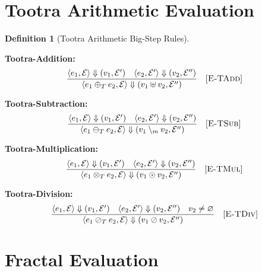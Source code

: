 \documentclass[11pt,twoside,openright]{book}
\theoremstyle{definition}
\newtheorem{definition}{Definition}[chapter]
\theoremstyle{plain}
\theoremstyle{remark}
\newcommand{\Tadd}{\oplus_T}
\newcommand{\Tsub}{\ominus_T}
\newcommand{\Tmul}{\otimes_T}
\newcommand{\Tdiv}{\oslash_T}
\newcommand{\bigstep}{\Downarrow}
\begin{document}
\section{Tootra Arithmetic Evaluation}

\begin{definition}[Tootra Arithmetic Big-Step Rules]
\label{def:tootra-bigstep}

\textbf{Tootra-Addition:}
\[
\frac{\langle e_1, \mathcal{E} \rangle \bigstep (v_1, \mathcal{E}') \quad \langle e_2, \mathcal{E}' \rangle \bigstep (v_2, \mathcal{E}'')}
{\langle e_1 \Tadd e_2, \mathcal{E} \rangle \bigstep (v_1 \uplus v_2, \mathcal{E}'')} \quad [\textsc{E-TAdd}]
\]

\textbf{Tootra-Subtraction:}
\[
\frac{\langle e_1, \mathcal{E} \rangle \bigstep (v_1, \mathcal{E}') \quad \langle e_2, \mathcal{E}' \rangle \bigstep (v_2, \mathcal{E}'')}
{\langle e_1 \Tsub e_2, \mathcal{E} \rangle \bigstep (v_1 \setminus_m v_2, \mathcal{E}'')} \quad [\textsc{E-TSub}]
\]

\textbf{Tootra-Multiplication:}
\[
\frac{\langle e_1, \mathcal{E} \rangle \bigstep (v_1, \mathcal{E}') \quad \langle e_2, \mathcal{E}' \rangle \bigstep (v_2, \mathcal{E}'')}
{\langle e_1 \Tmul e_2, \mathcal{E} \rangle \bigstep (v_1 \odot v_2, \mathcal{E}'')} \quad [\textsc{E-TMul}]
\]

\textbf{Tootra-Division:}
\[
\frac{\langle e_1, \mathcal{E} \rangle \bigstep (v_1, \mathcal{E}') \quad \langle e_2, \mathcal{E}' \rangle \bigstep (v_2, \mathcal{E}'') \quad v_2 \neq \varnothing}
{\langle e_1 \Tdiv e_2, \mathcal{E} \rangle \bigstep (v_1 \oslash v_2, \mathcal{E}'')} \quad [\textsc{E-TDiv}]
\]
\end{definition}

\section{Fractal Evaluation}
\end{document}
